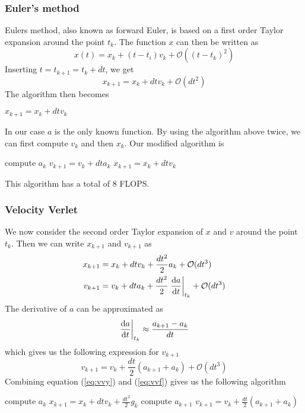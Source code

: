 \subsubsection{Euler's method}
\label{sec:fe}
Eulers method, also known as forward Euler, is based on a first order Taylor expansion around the point $t_k$. The function $x$ can then be written as
\begin{equation}
	x(t) = x_k + (t-t_i)v_k+\mathcal{O}\left(\left( t-t_k\right) ^2\right)
\end{equation}
Inserting $t=t_{k+1} = t_k + dt$, we get
\begin{equation}
	x_{k+1}=x_k + dtv_k + \mathcal{O}\left( dt^2\right)
\end{equation}
The algorithm then becomes
\begin{algorithm}[h!]
	\SetAlgoLined
		$x_{k+1} = x_k+dtv_k$\;
\end{algorithm}

In our case $a$ is the only known function. By using the algorithm above twice, we can first compute $v_k$ and then $x_k$. Our modified algorithm is
\begin{algorithm}[h!]
	\SetAlgoLined
		compute $a_k$\;
		$v_{k+1} = v_k+dta_k$\;
		$x_{k+1} = x_k+dtv_k$\;
\end{algorithm}
This algorithm has a total of 8 FLOPS.

\subsubsection{Velocity Verlet}
\label{sec:vv}
We now consider the second order Taylor expansion of $x$ and $v$ around the point $t_k$. Then we can write $x_{k+1}$ and $v_{k+1}$ as
\begin{align} \label{eq:vvy}
	x_{k+1}&=x_k + dtv_k + \frac{dt^2}{2}a_k  +\mathcal{O}(dt^3) \\
	v_{k+1}&=v_k + dta_k + \frac{dt^2}{2}\left.\dv{a}{t}\right\rvert_{t_k}  +\mathcal{O}(dt^3)
\end{align}
The derivative of $a$ can be approximated as
\begin{equation}
	 \left.\dv{a}{t}\right\rvert_{t_k} \approx \frac{a_{k+1}-a_k}{dt}
\end{equation}
which gives us the following expression for $v_{k+1}$
\begin{equation}\label{eq:vvf}
	v_{k+1}=v_k + \frac{dt}{2}\left(a_{k+1} + a_k \right)  +\mathcal{O}(dt^3)
\end{equation}
Combining equation (\ref{eq:vvy}) and (\ref{eq:vvf}) gives us the following algorithm
\begin{algorithm}[h!]
	\SetAlgoLined
		compute $a_k$\;
		$x_{k+1} = x_k+dtv_k+\frac{dt^2}{2}g_k$\;
		compute $a_{k+1}$\;
		$v_{k+1} = v_k + \frac{dt}{2}\left(a_{k+1}+a_k\right)$\;
\end{algorithm}


